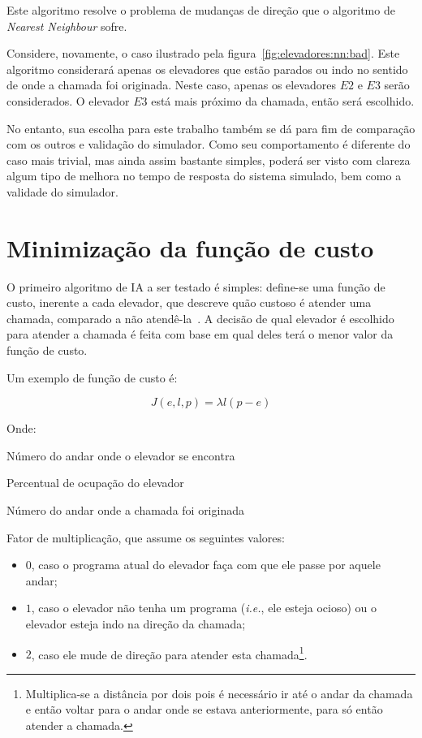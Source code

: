 Este algoritmo resolve o problema de mudanças de direção que o algoritmo de
\textit{Nearest Neighbour} sofre.

Considere, novamente, o caso ilustrado pela figura~\ref{fig:elevadores:nn:bad}.
Este algoritmo considerará apenas os elevadores que estão parados ou indo no
sentido de onde a chamada foi originada. Neste caso, apenas os elevadores $E2$ e
$E3$ serão considerados. O elevador $E3$ está mais próximo da chamada, então
será escolhido.

No entanto, sua escolha para este trabalho também se dá para fim de comparação
com os outros e validação do simulador. Como seu comportamento é diferente do
caso mais trivial, mas ainda assim bastante simples, poderá ser visto com clareza
algum tipo de melhora no tempo de resposta do sistema simulado, bem como a validade do simulador.

\section{\label{sec:ai:minimize-cost-function}Minimização da função de custo}

O primeiro algoritmo de IA a ser testado é simples: define-se uma
função de custo, inerente a cada elevador, que descreve quão custoso
é atender uma chamada, comparado a não atendê-la~\cite{Friese20061908}.
A decisão de qual elevador é escolhido para atender a chamada é feita com base
em qual deles terá o menor valor da função de custo.

Um exemplo de função de custo é:

\[
  J(e, l, p) = \lambda l(p - e)
\]

Onde:
\begin{description}[leftmargin=!,labelwidth=\widthof{\bfseries Pu}]
\item[$\boldsymbol{e}$] Número do andar onde o elevador se encontra
\item[$\boldsymbol{l}$] Percentual de ocupação do elevador
\item[$\boldsymbol{p}$] Número do andar onde a chamada foi originada
\item[$\boldsymbol{\lambda}$] Fator de multiplicação, que assume os seguintes valores:
  \begin{itemize}
    \item $0$, caso o programa atual do elevador faça com que ele passe por
      aquele andar;
    \item $1$, caso o elevador não tenha um programa (\textit{i.e.},
      ele esteja ocioso) ou o elevador esteja indo na direção da chamada;
    \item $2$, caso ele mude de direção para atender esta chamada\footnote{Multiplica-se
        a distância por dois pois é necessário ir até o andar da chamada e então
        voltar para o andar onde se estava anteriormente, para só então atender
        a chamada.}.
  \end{itemize}
\end{description}

